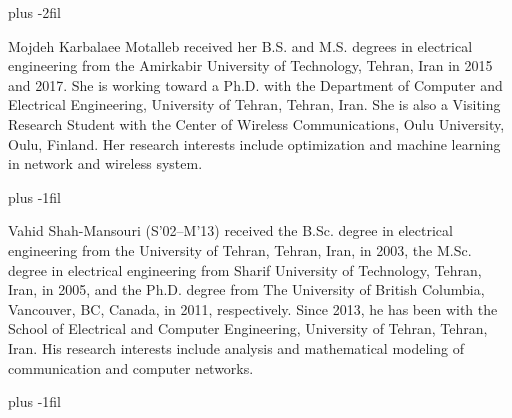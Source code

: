 \documentclass[lettersize,journal]{IEEEtran}
\begin{document}
 \vskip 0pt plus -2fil
 \begin{IEEEbiography}
 { Mojdeh Karbalaee Motalleb} received her B.S. and M.S. degrees in electrical engineering from the Amirkabir University of Technology, Tehran, Iran in 2015 and 2017. She is working toward a Ph.D. with the Department of Computer and Electrical Engineering, University of Tehran, Tehran, Iran. She is also a Visiting Research Student with the Center of Wireless Communications, Oulu University, Oulu, Finland. Her research interests include optimization and machine learning in network and wireless system.
 \end{IEEEbiography}
  \vskip 0pt plus -1fil
\begin{IEEEbiography}{Vahid Shah-Mansouri}%
(S’02–M’13) received the B.Sc. degree in electrical
engineering from the University of Tehran, Tehran, Iran, in 2003,
the M.Sc. degree in electrical engineering from Sharif University
of Technology, Tehran, Iran, in 2005, and the Ph.D. degree from The
University of British Columbia, Vancouver, BC, Canada, in 2011,
respectively. Since 2013, he has been with the
School of Electrical and Computer Engineering, University of Tehran,
Tehran, Iran. His research interests include analysis and mathematical
modeling of communication and computer networks.
\end{IEEEbiography}
 \vskip 0pt plus -1fil
\end{document}
